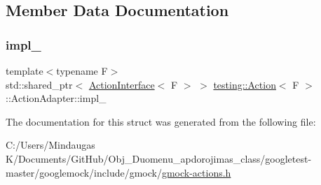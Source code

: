 \subsection{Member Data Documentation}
\mbox{\label{structtesting_1_1_action_1_1_action_adapter_acb8dd3d9a9eaf172bae160082dd2a50e}} 
\subsubsection{\texorpdfstring{impl\_}{impl\_}}
{\footnotesize\ttfamily template$<$typename F$>$ \\
std\+::shared\+\_\+ptr$<$ \mbox{\hyperlink{classtesting_1_1_action_interface}{Action\+Interface}}$<$ F $>$ $>$ \mbox{\hyperlink{classtesting_1_1_action}{testing\+::\+Action}}$<$ F $>$\+::Action\+Adapter\+::impl\+\_\+}



The documentation for this struct was generated from the following file\+:\begin{DoxyCompactItemize}
\item 
C\+:/\+Users/\+Mindaugas K/\+Documents/\+Git\+Hub/\+Obj\+\_\+\+Duomenu\+\_\+apdorojimas\+\_\+class/googletest-\/master/googlemock/include/gmock/\mbox{\hyperlink{googletest-master_2googlemock_2include_2gmock_2gmock-actions_8h}{gmock-\/actions.\+h}}\end{DoxyCompactItemize}
